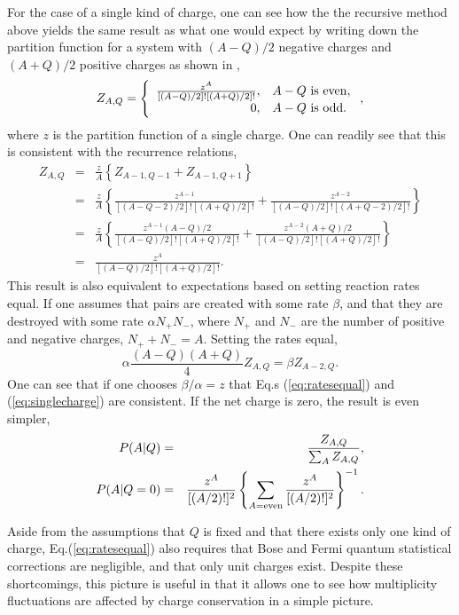 For the case of a single kind of charge, one can see how the the recursive method above yields the same result as what one would expect by writing down the partition function for a system with $(A-Q)/2$ negative charges and $(A+Q)/2$ positive charges as shown in \cite{Savchuk:2019xfg},
\begin{eqnarray}
\label{eq:singlecharge}
Z_{A,Q}=\left\{\begin{array}{rl}
\frac{z^A}{[(A-Q)/2]![(A+Q)/2]!},&A-Q~{\rm is~even},\\
0,&A-Q~{\rm is~odd}.\end{array}\right. ,
\end{eqnarray}
where $z$ is the partition function of a single charge. One can readily see that this is consistent with the recurrence relations,
\begin{eqnarray}
Z_{A,Q}&=&\frac{z}{A}\left\{Z_{A-1,Q-1}+Z_{A-1,Q+1}\right\}\\
\nonumber
&=&\frac{z}{A}\left\{\frac{z^{A-1}}{[(A-Q-2)/2]![(A+Q)/2]!}+\frac{z^{A-2}}{[(A-Q)/2]![(A+Q-2)/2]!}\right\}\\
\nonumber
&=&\frac{z}{A}\left\{\frac{z^{A-1}(A-Q)/2}{[(A-Q)/2]![(A+Q)/2]!}+\frac{z^{A-2}(A+Q)/2}{[(A-Q)/2]![(A+Q)/2]!}\right\}\\
&=&\frac{z^A}{[(A-Q)/2]![(A+Q)/2]!}.
\end{eqnarray}
This result is also equivalent to expectations based on setting reaction rates equal. If one assumes that pairs are created with some rate $\beta$, and that they are destroyed with some rate $\alpha N_+N_-$, where $N_+$ and $N_-$ are the number of positive and negative charges, $N_++N_-=A$. Setting the rates equal,
\begin{equation}\label{eq:ratesequal}
\alpha \frac{(A-Q)(A+Q)}{4}Z_{A,Q}=\beta Z_{A-2,Q}.
\end{equation}
One can see that if one chooses $\beta/\alpha=z$ that Eq.s (\ref{eq:ratesequal}) and (\ref{eq:singlecharge}) are consistent. If the net charge is zero, the result is even simpler,
\begin{eqnarray}
\label{eq:PAgivenQcanonical}
P(A|Q)&=&\frac{Z_{A,Q}}{\sum_A Z_{A,Q}},\\
\nonumber
P(A|Q=0)&=& \frac{z^A}{[(A/2)!]^2}\left\{\sum_{A={\rm even}} \frac{z^A}{[(A/2)!]^2}\right\}^{-1}.
\end{eqnarray}

Aside from the assumptions that $Q$ is fixed and that there exists only one kind of charge, Eq.(\ref{eq:ratesequal}) also requires that Bose and Fermi quantum statistical corrections are negligible, and that only unit charges exist. Despite these shortcomings, this picture is useful in that it allows one to see how multiplicity fluctuations are affected by charge conservation in a simple picture. 
